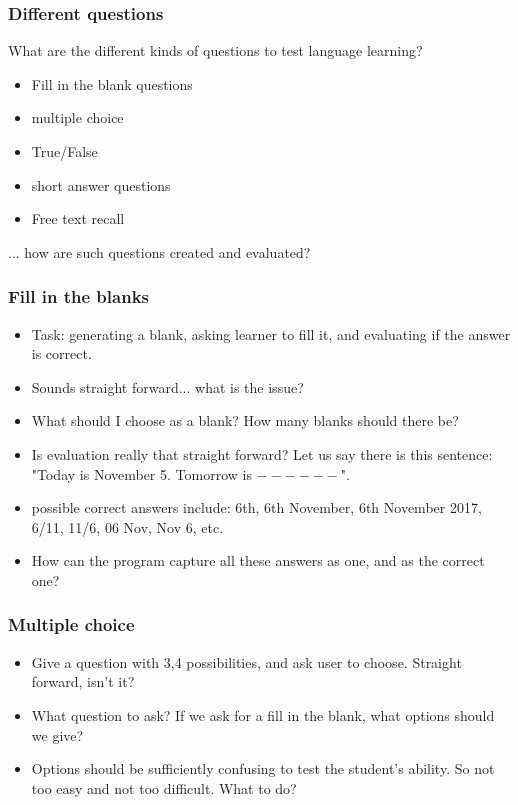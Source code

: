 \documentclass{beamer}
\begin{document}
\begin{frame}
\frametitle{Different questions}
What are the different kinds of questions to test language learning?
\begin{itemize}
\item Fill in the blank questions
\item multiple choice
\item True/False
\item short answer questions
\item Free text recall
\end{itemize}
... how are such questions created and evaluated? 
\end{frame}

\begin{frame}
\frametitle{Fill in the blanks}
\begin{itemize}
\item Task: generating a blank, asking learner to fill it, and evaluating if the answer is correct.
\item Sounds straight forward... what is the issue? \pause
\item What should I choose as a blank? How many blanks should there be? \pause
\item Is evaluation really that straight forward? Let us say there is this sentence: "Today is November 5. Tomorrow is $------$".
\item possible correct answers include: 6th, 6th November, 6th November 2017, 6/11, 11/6, 06 Nov, Nov 6, etc. 
\item How can the program capture all these answers as one, and as the correct one?
\end{itemize}
\end{frame}

\begin{frame}
\frametitle{Multiple choice}
\begin{itemize}
\item Give a question with 3,4 possibilities, and ask user to choose. Straight forward, isn't it? \pause
\item What question to ask? If we ask for a fill in the blank, what options should we give?
\item Options should be sufficiently confusing to test the student's ability. So not too easy and not too difficult. What to do?
\end{itemize}
\end{frame}
\end{document}
